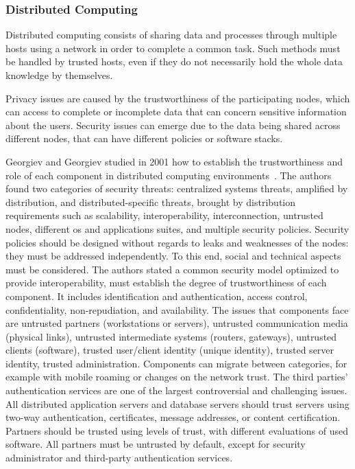 \subsubsection{Distributed Computing}
\label{subsubsec:state_review_results_distribution}

Distributed computing consists of sharing data and processes through multiple hosts using a network in order to complete a common task. Such methods must be handled by trusted hosts, even if they do not necessarily hold the whole data knowledge by themselves.

Privacy issues are caused by the trustworthiness of the participating nodes, which can access to complete or incomplete data that can concern sensitive information about the users. Security issues can emerge due to the data being shared across different nodes, that can have different policies or software stacks.

Georgiev and Georgiev studied in 2001 how to establish the trustworthiness and role of each component in distributed computing environments~\cite{georgiev_security_2001}. The authors found two categories of security threats: centralized systems threats, amplified by distribution, and distributed-specific threats, brought by distribution requirements such as scalability, interoperability, interconnection, untrusted nodes, different \gls{os} and applications suites, and multiple security policies. Security policies should be designed without regards to leaks and weaknesses of the nodes: they must be addressed independently. To this end, social and technical aspects must be considered. The authors stated a common security model optimized to provide interoperability, must establish the degree of trustworthiness of each component. It includes identification and authentication, access control, confidentiality, non-repudiation, and availability. The issues that components face are untrusted partners (workstations or servers), untrusted communication media (physical links), untrusted intermediate systems (routers, gateways), untrusted clients (software), trusted user/client identity (unique identity), trusted server identity, trusted administration. Components can migrate between categories, for example with mobile roaming or changes on the network trust. The third parties' authentication services are one of the largest controversial and challenging issues. All distributed application servers and database servers should trust servers using two-way authentication, certificates, message addresses, or content certification. Partners should be trusted using levels of trust, with different evaluations of used software. All partners must be untrusted by default, except for security administrator and third-party authentication services. %

